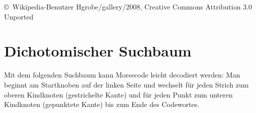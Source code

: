 \documentclass{scrartcl}
\begin{document}
    \vfill
    
    \hfill
    \begin{minipage}[t]{8cm}
      \setlength{\parskip}{.5\baselineskip}
      \scriptsize\color{gray}
      \copyright\ Wikipedia-Benutzer Hgrobe/gallery/2008,
        Creative Commons Attribution 3.0 Unported
    \end{minipage}
    \hfill\strut
    
    \newpage
    
    \section{Dichotomischer Suchbaum}
    
    Mit dem folgenden Suchbaum kann Morsecode leicht decodiert werden:
    Man beginnt am Startknoben auf der linken Seite
    und wechselt für jeden Strich
    zum oberen Kindknoten (gestrichelte Kante)
    und für jeden Punkt zum unteren Kindknoten (gepunktete Kante) bis zum
    Ende des Codewortes. 
    
    \baselineskip
    
\end{document}
